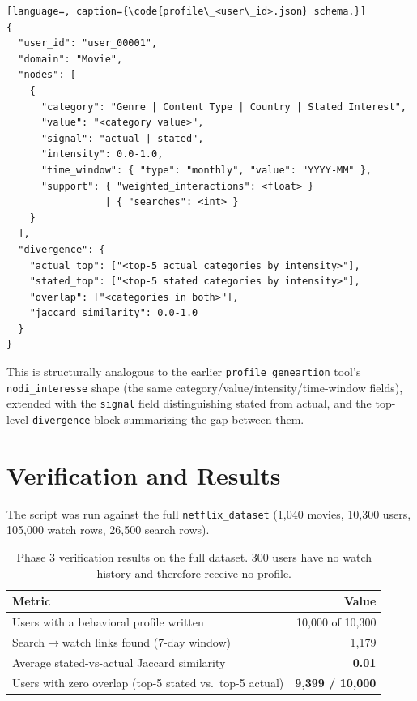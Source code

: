 \documentclass[11pt,a4paper]{article}
\newcommand{\code}[1]{\texttt{#1}}
\begin{document}
\begin{lstlisting}[language=, caption={\code{profile\_<user\_id>.json} schema.}]
{
  "user_id": "user_00001",
  "domain": "Movie",
  "nodes": [
    {
      "category": "Genre | Content Type | Country | Stated Interest",
      "value": "<category value>",
      "signal": "actual | stated",
      "intensity": 0.0-1.0,
      "time_window": { "type": "monthly", "value": "YYYY-MM" },
      "support": { "weighted_interactions": <float> }
                 | { "searches": <int> }
    }
  ],
  "divergence": {
    "actual_top": ["<top-5 actual categories by intensity>"],
    "stated_top": ["<top-5 stated categories by intensity>"],
    "overlap": ["<categories in both>"],
    "jaccard_similarity": 0.0-1.0
  }
}
\end{lstlisting}

This is structurally analogous to the earlier \code{profile\_geneartion} tool's
\code{nodi\_interesse} shape (the same category/value/intensity/time-window fields), extended
with the \code{signal} field distinguishing stated from actual, and the top-level
\code{divergence} block summarizing the gap between them.

\section{Verification and Results}

The script was run against the full \code{netflix\_dataset} (1{,}040 movies, 10{,}300 users,
105{,}000 watch rows, 26{,}500 search rows).

\begin{table}[H]
\centering
\begin{tabular}{lr}
\toprule
\textbf{Metric} & \textbf{Value} \\
\midrule
Users with a behavioral profile written & 10{,}000 of 10{,}300 \\
Search$\to$watch links found (7-day window) & 1{,}179 \\
Average stated-vs-actual Jaccard similarity & \textbf{0.01} \\
Users with zero overlap (top-5 stated vs.\ top-5 actual) & \textbf{9{,}399 / 10{,}000} \\
\bottomrule
\end{tabular}
\caption{Phase 3 verification results on the full dataset. 300 users have no watch history and
therefore receive no profile.}
\label{tab:phase3-results}
\end{table}
\end{document}
